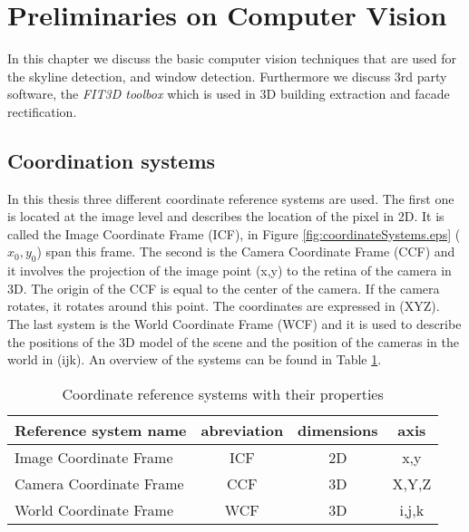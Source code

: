\section{Preliminaries on Computer Vision}
In this chapter we discuss the basic computer vision techniques that are used for
the skyline detection, and window detection.  Furthermore we discuss 3rd
party software, the \emph{FIT3D toolbox} \cite{Fit3d} which is used in 3D building extraction and facade rectification.

\subsection{Coordination systems}
In this thesis three different coordinate reference systems are used. 
The first one is located at the image level and describes the
location of the pixel in 2D. It is called the Image Coordinate Frame (ICF), in
Figure \ref{fig:coordinateSystems.eps} ($x_0,y_0$) span this frame.
The second is the Camera Coordinate
Frame (CCF) and it involves the projection of the image point (x,y) to the
retina of the camera in 3D.  The origin of the CCF is equal to the center of the
camera. If the camera rotates, it rotates around this point. The coordinates are
expressed in (XYZ). \\
The last system is the World Coordinate Frame (WCF) and it is used to describe the positions of the 3D model of the
scene and the position of the cameras in the world in (ijk). An overview of the
systems can be found in Table \ref{tab:coord}.

\begin{table}[ht]
	\caption{Coordinate reference systems with their properties}
	\label{tab:coord}
	\begin{tabular}{|l||c|c|c|}
	\hline
	Reference system name		&	abreviation	&	dimensions	&	axis\\
	\hline
	\hline
	Image Coordinate Frame	&   ICF			&	2D			& 	x,y\\
	\hline
	Camera Coordinate Frame	&   CCF			&	3D			& 	X,Y,Z\\
	\hline
	World Coordinate Frame	&   WCF			&	3D			& 	i,j,k\\
	\hline
	\end{tabular}
\end{table}


%  
%  

